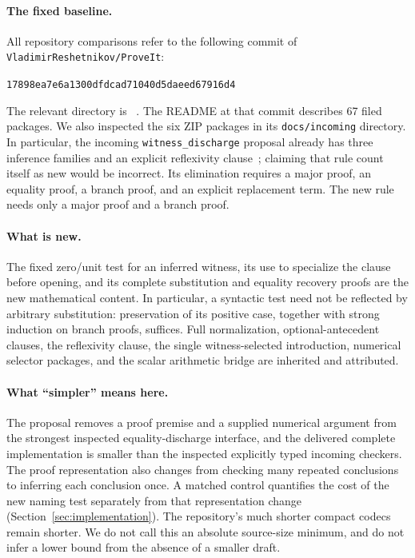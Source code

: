 \documentclass[11pt,a4paper]{article}
\theoremstyle{definition}\newtheorem{definition}[theorem]{Definition}
\theoremstyle{remark}\newtheorem{remark}[theorem]{Remark}
\begin{document}
\paragraph{The fixed baseline.}
All repository comparisons refer to the following commit of
\texttt{VladimirReshetnikov/ProveIt}:
\begin{center}\small\texttt{17898ea7e6a1300dfdcad71040d5daeed67916d4}\end{center}
The relevant directory is
~\cite{repo}.
The README at that commit describes 67 filed packages. We also inspected
the six ZIP packages in its \texttt{docs/incoming} directory. In particular,
the incoming \texttt{witness\_discharge} proposal already has three inference
families and an explicit reflexivity clause~\cite{witness}; claiming that
rule count itself as new would be incorrect. Its elimination requires a
major proof, an equality proof, a branch proof, and an explicit replacement
term. The new rule needs only a major proof and a branch proof.

\paragraph{What is new.}
The fixed zero/unit test for an inferred witness, its use to specialize
the clause before opening, and its complete substitution and equality
recovery proofs are the new mathematical content. In particular, a syntactic
test need not be reflected by arbitrary substitution: preservation of its
positive case, together with strong induction on branch proofs, suffices.
Full normalization, optional-antecedent clauses, the reflexivity clause,
the single witness-selected introduction, numerical selector packages,
and the scalar arithmetic bridge are inherited and attributed.

\paragraph{What ``simpler'' means here.}
The proposal removes a proof premise and a supplied numerical argument
from the strongest inspected equality-discharge interface, and the delivered
complete implementation is smaller than the inspected explicitly typed
incoming checkers. The proof representation also changes from checking many
repeated conclusions to inferring each conclusion once. A matched control
quantifies the cost of the new naming test separately from that representation
change (Section~\ref{sec:implementation}). The repository's much shorter
compact codecs remain shorter. We do not call this an absolute source-size
minimum, and do not infer a lower bound from the absence of a smaller draft.
\end{document}
